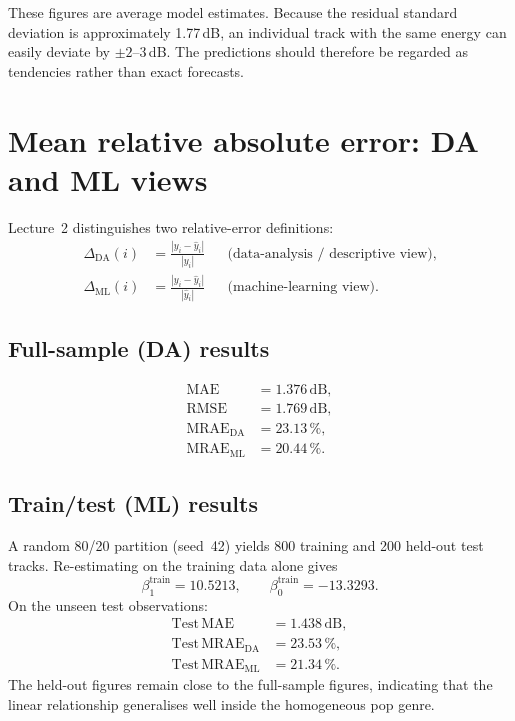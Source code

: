 \documentclass[11pt,a4paper]{article}
\begin{document}
These figures are average model estimates. Because the residual standard
deviation is approximately 1.77\,dB, an individual track with the same energy
can easily deviate by $\pm2$--$3$\,dB. The predictions should therefore be
regarded as tendencies rather than exact forecasts.

\section{Mean relative absolute error: DA and ML views}

Lecture~2 distinguishes two relative-error definitions:
\begin{align}
  \Delta_{\mathrm{DA}}(i) &= \frac{|y_i-\hat{y}_i|}{|y_i|}
    && \text{(data-analysis / descriptive view)}, \\[0.4em]
  \Delta_{\mathrm{ML}}(i) &= \frac{|y_i-\hat{y}_i|}{|\hat{y}_i|}
    && \text{(machine-learning view)}.
\end{align}

\subsection{Full-sample (DA) results}

\begin{align*}
  \mathrm{MAE}   &= 1.376\,\mathrm{dB}, \\
  \mathrm{RMSE}  &= 1.769\,\mathrm{dB}, \\
  \mathrm{MRAE}_{\mathrm{DA}} &= 23.13\,\%, \\
  \mathrm{MRAE}_{\mathrm{ML}} &= 20.44\,\%.
\end{align*}

\subsection{Train/test (ML) results}

A random 80/20 partition (seed~42) yields 800 training and 200 held-out test
tracks. Re-estimating on the training data alone gives
\[
  \beta_1^{\mathrm{train}} = 10.5213, \qquad
  \beta_0^{\mathrm{train}} = -13.3293.
\]
On the unseen test observations:
\begin{align*}
  \mathrm{Test\,MAE} &= 1.438\,\mathrm{dB}, \\
  \mathrm{Test\,MRAE}_{\mathrm{DA}} &= 23.53\,\%, \\
  \mathrm{Test\,MRAE}_{\mathrm{ML}} &= 21.34\,\%.
\end{align*}
The held-out figures remain close to the full-sample figures, indicating that
the linear relationship generalises well inside the homogeneous pop genre.
\end{document}
